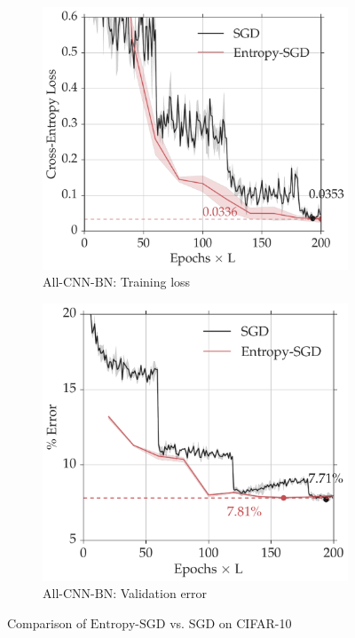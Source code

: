 \documentclass[10pt]{article}
\newcommand{\entropysgd}{\mathrm{Entropy}\textrm{-}\mathrm{SGD}}
\newcommand{\allcnn}{\textrm{All-CNN-BN}}
\begin{document}
\begin{figure}[htp!]
\centering
    \begin{subfigure}[b]{0.45\textwidth}
        \centering
        \includegraphics[width=1.06\textwidth]{allcnn_loss.pdf}
        \caption{\small $\allcnn$: Training loss}
        \label{fig:allcnn_loss}
    \end{subfigure}
    \hspace{0.2in}
    \begin{subfigure}[b]{0.45\textwidth}
        \centering
        \includegraphics[width=\textwidth]{allcnn_valid.pdf}
        \caption{\small $\allcnn$: Validation error}
        \label{fig:allcnn_valid}
    \end{subfigure}
\caption{\small Comparison of $\entropysgd$ vs. SGD on CIFAR-10}
\label{fig:allcnn}
\end{figure}
\end{document}
